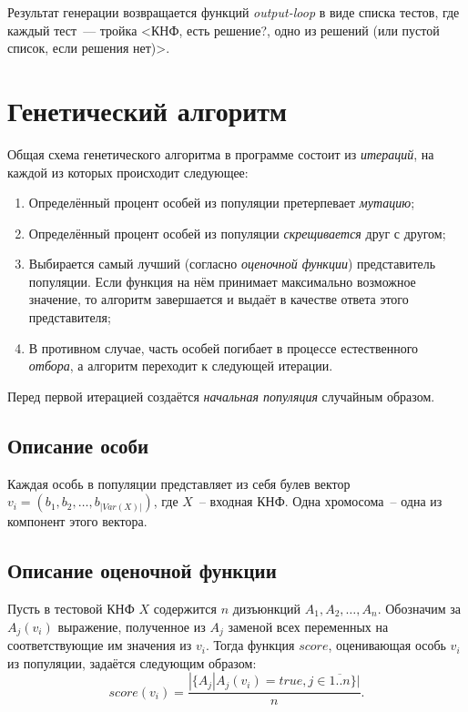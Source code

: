 \documentclass[12pt]{article}
\begin{document}
    Результат генерации возвращается функций \textit{output-loop} в виде списка тестов, где каждый тест~--- тройка <КНФ, есть решение?, одно из
    решений (или пустой список, если решения нет)>.


\pagebreak

    \section{Генетический алгоритм}
        Общая схема генетического алгоритма в программе состоит из \textit{итераций}, на каждой из которых происходит следующее:
        \begin{enumerate}
            \item Определённый процент особей из популяции претерпевает \textit{мутацию};
            \item Определённый процент особей из популяции \textit{скрещивается} друг с другом;
            \item Выбирается самый лучший (согласно \textit{оценочной функции}) представитель популяции. Если функция на нём принимает максимально возможное значение,
                то алгоритм завершается и выдаёт в качестве ответа этого представителя;
            \item В противном случае, часть особей погибает в процессе естественного \textit{отбора}, а алгоритм переходит к следующей итерации.
        \end{enumerate}

        Перед первой итерацией создаётся \textit{начальная популяция} случайным образом.

        \subsection{Описание особи}
        Каждая особь в популяции представляет из себя булев вектор $v_i = (b_1, b_2, \ldots, b_{|Var(X)|})$, где $X$~-- входная КНФ. Одна хромосома~-- одна из компонент этого вектора.

        \subsection{Описание оценочной функции}
        Пусть в тестовой КНФ $X$ содержится $n$ дизъюнкций $A_1, A_2, \ldots, A_n$. Обозначим за $A_j(v_i)$ выражение, полученное из $A_j$ заменой всех переменных на соответствующие
        им значения из $v_i$.
        Тогда функция $score$, оценивающая особь $v_i$ из популяции, задаётся следующим образом:
        $$ score(v_i) = \frac{|\{A_j | A_j(v_i) = true, j \in \overline{1..n}\}|}{n}.$$
\end{document}
